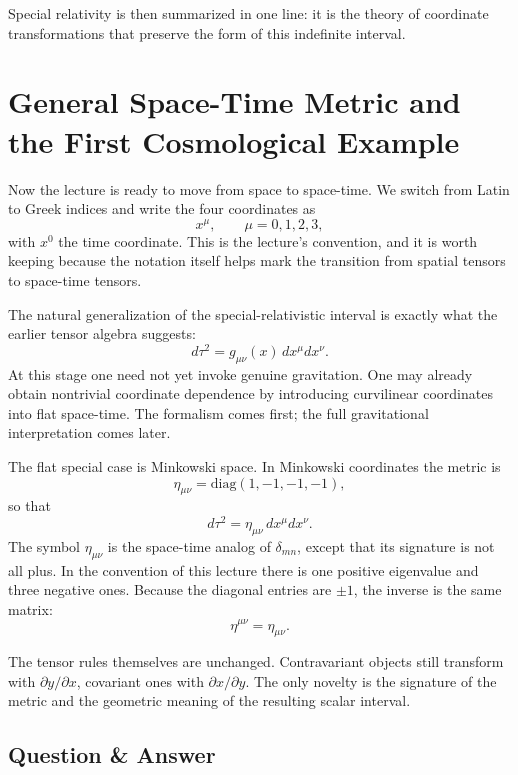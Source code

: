 Special relativity is then summarized in one line: it is the theory of coordinate transformations that preserve the form of this indefinite interval.

\section{General Space-Time Metric and the First Cosmological Example}

Now the lecture is ready to move from space to space-time. We switch from Latin to Greek indices and write the four coordinates as
\[
x^\mu,\qquad \mu=0,1,2,3,
\]
with \(x^0\) the time coordinate. This is the lecture's convention, and it is worth keeping because the notation itself helps mark the transition from spatial tensors to space-time tensors.

The natural generalization of the special-relativistic interval is exactly what the earlier tensor algebra suggests:
\begin{equation}
d\tau^2=g_{\mu\nu}(x)\,dx^\mu dx^\nu.
\end{equation}
At this stage one need not yet invoke genuine gravitation. One may already obtain nontrivial coordinate dependence by introducing curvilinear coordinates into flat space-time. The formalism comes first; the full gravitational interpretation comes later.

The flat special case is Minkowski space. In Minkowski coordinates the metric is
\begin{equation}
\eta_{\mu\nu}=\mathrm{diag}(1,-1,-1,-1),
\end{equation}
so that
\begin{equation}
d\tau^2=\eta_{\mu\nu}\,dx^\mu dx^\nu.
\end{equation}
The symbol \(\eta_{\mu\nu}\) is the space-time analog of \(\delta_{mn}\), except that its signature is not all plus. In the convention of this lecture there is one positive eigenvalue and three negative ones. Because the diagonal entries are \(\pm1\), the inverse is the same matrix:
\begin{equation}
\eta^{\mu\nu}=\eta_{\mu\nu}.
\end{equation}

The tensor rules themselves are unchanged. Contravariant objects still transform with \(\partial y/\partial x\), covariant ones with \(\partial x/\partial y\). The only novelty is the signature of the metric and the geometric meaning of the resulting scalar interval.

\subsection{Question \& Answer}

